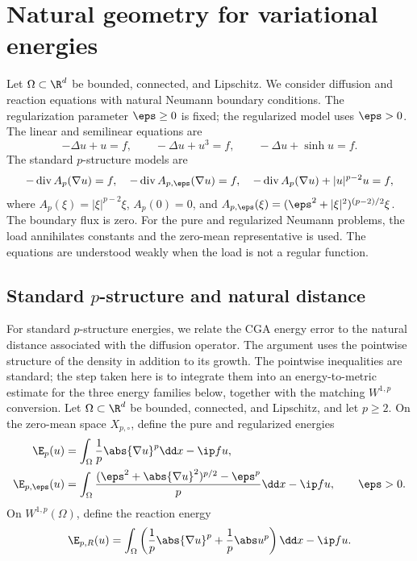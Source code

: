 \section{Natural geometry for variational energies}
\label{sec:pgeometry}

Let \(\Omega\subset\R^d\) be bounded, connected, and Lipschitz.
We consider diffusion and reaction equations with natural Neumann boundary conditions.
The regularization parameter \(\eps\geq0\) is fixed; the regularized model uses \(\eps>0\).
The linear and semilinear equations are
\[
-\Delta u+u=f,\qquad -\Delta u+u^3=f,\qquad -\Delta u+\sinh u=f.
\]
The standard \(p\)-structure models are
\[
-\operatorname{div}A_p(\nabla u)=f,\quad
-\operatorname{div}A_{p,\eps}(\nabla u)=f,\quad
-\operatorname{div}A_p(\nabla u)+|u|^{p-2}u=f,
\]
where \(A_p(\xi)=|\xi|^{p-2}\xi\), \(A_p(0)=0\), and
\(A_{p,\eps}(\xi)=(\eps^2+|\xi|^2)^{(p-2)/2}\xi\).
The boundary flux is zero. For the pure and regularized Neumann problems, the load annihilates constants and the zero-mean representative is used.
The equations are understood weakly when the load is not a regular function.



\subsection{Standard \texorpdfstring{\(p\)}{p}-structure and natural distance}

For standard \(p\)-structure energies, we relate the CGA energy error to the natural distance
associated with the diffusion operator. The argument uses the pointwise structure of the density in
addition to its growth. The pointwise inequalities are standard; the step taken here is to integrate
them into an energy-to-metric estimate for the three energy families below, together with the
matching \(W^{1,p}\) conversion. Let \(\Omega\subset\R^d\) be bounded, connected, and Lipschitz, and
let \(p\geq2\). On the zero-mean space \(X_{p,\circ}\), define the pure and regularized energies
\begin{align}
 \E_p(u)&=\int_\Omega\frac1p\abs{\nabla u}^p\dd x-\ip fu,
 \label{eq:pure-energy}\\
 \E_{p,\eps}(u)&=\int_\Omega
 \frac{(\eps^2+\abs{\nabla u}^2)^{p/2}-\eps^p}{p}\dd x-\ip fu,
 \qquad\eps>0.
 \label{eq:reg-energy}
\end{align}
On \(W^{1,p}(\Omega)\), define the reaction energy
\begin{equation}
 \E_{p,R}(u)=\int_\Omega\left(\frac1p\abs{\nabla u}^p+
 \frac1p\abs u^p\right)\dd x-\ip fu.
 \label{eq:reaction-energy}
\end{equation}

